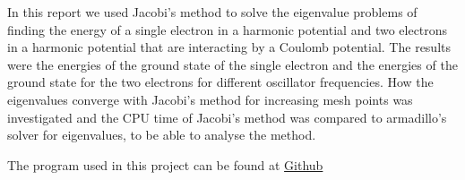 In this report we used Jacobi's method to solve the eigenvalue problems of finding the energy of a single electron in a harmonic potential and two electrons in a harmonic potential that are interacting by a Coulomb potential. The results were the energies of the ground state of the single electron and the energies of the ground state for the two electrons for different oscillator frequencies. How the eigenvalues converge with Jacobi's method for increasing mesh points was investigated and the CPU time of Jacobi's method was compared to armadillo's solver for eigenvalues, to be able to analyse the method.


The program used in this project can be found at \href{https://github.com/kjetka/Project2}{Github}
